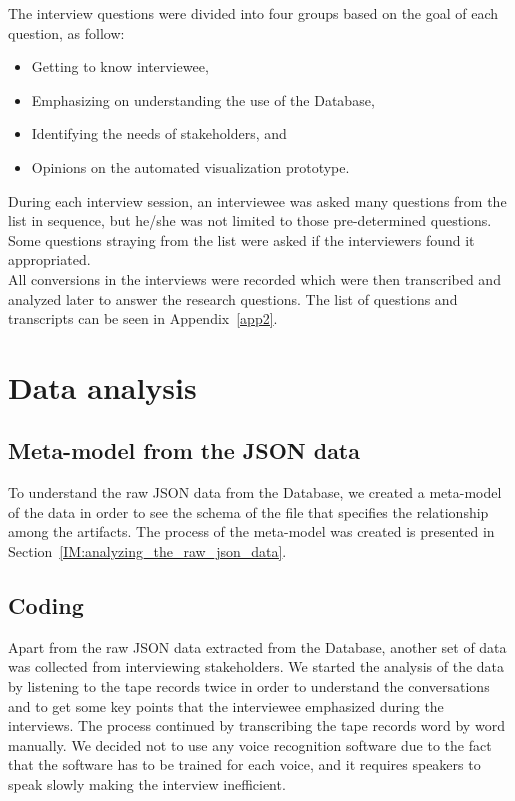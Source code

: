 The interview questions were divided into four groups based on the goal of each question, as follow:
\vspace{0.5em}
\begin{itemize}
    \item Getting to know interviewee,
    \item Emphasizing on understanding the use of the Database,
    \item Identifying the needs of stakeholders, and
    \item Opinions on the automated visualization prototype.
\end{itemize}
\vspace{0.5em}
During each interview session, an interviewee was asked many questions from the list in sequence, but he/she was not limited to those pre-determined questions. Some questions straying from the list were asked if the interviewers found it appropriated.\\

All conversions in the interviews were recorded which were then transcribed and analyzed later to answer the research questions. The list of questions and transcripts can be seen in Appendix~\ref{app2}.


\section{Data analysis}
\subsection{Meta-model from the JSON data}
To understand the raw JSON data from the Database, we created a meta-model of the data in order to see the schema of the file that specifies the relationship among the artifacts. The process of the meta-model was created is presented in Section~\ref{IM:analyzing_the_raw_json_data}.

\subsection{Coding}
\label{ME:coding}
Apart from the raw JSON data extracted from the Database, another set of data was collected from interviewing stakeholders. We started the analysis of the data by listening to the tape records twice in order to understand the conversations and to get some key points that the interviewee emphasized during the interviews. The process continued by transcribing the tape records word by word manually. We decided not to use any voice recognition software due to the fact that the software has to be trained for each voice, and it requires speakers to speak slowly making the interview inefficient.\\


